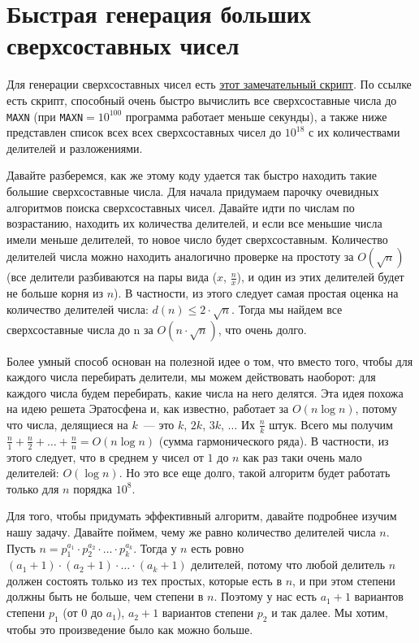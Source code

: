 \section{Быстрая генерация больших сверхсоставных чисел}

Для генерации сверхсоставных чисел есть \href{https://gist.github.com/dario2994/fb4713f252ca86c1254d}{этот замечательный скрипт}. По ссылке есть скрипт, способный очень быстро вычислить все сверхсоставные числа до \verb+MAXN+ (при \verb+MAXN+$=10^{100}$ программа работает меньше секунды), а также ниже представлен список всех всех сверхсоставных чисел до $10^{18}$ с их количествами делителей и разложениями.

Давайте разберемся, как же этому коду удается так быстро находить такие большие сверхсоставные числа. Для начала придумаем парочку очевидных алгоритмов поиска сверхсоставных чисел. Давайте идти по числам по возрастанию, находить их количества делителей, и если все меньшие числа имели меньше делителей, то новое число будет сверхсоставным. Количество делителей числа можно находить аналогично проверке на простоту за $O(\sqrt n)$ (все делители разбиваются на пары вида ($x$, $\frac{n}{x}$), и один из этих делителей будет не больше корня из $n$). В частности, из этого следует самая простая оценка на количество делителей числа: $d(n) \le 2 \cdot \sqrt n$. Тогда мы найдем все сверхсоставные числа до n за $O(n \cdot \sqrt n)$, что очень долго.

Более умный способ основан на полезной идее о том, что вместо того, чтобы для каждого числа перебирать делители, мы можем действовать наоборот: для каждого числа будем перебирать, какие числа на него делятся. Эта идея похожа на идею решета Эратосфена и, как известно, работает за $O(n \log n)$, потому что числа, делящиеся на $k$~--- это $k$,  $2k$, $3k$, $\ldots$ Их $\frac{n}{k}$ штук. Всего мы получим $\frac{n}{1} + \frac{n}{2} + \ldots + \frac{n}{n} = O(n \log n)$ (сумма гармонического ряда). В частности, из этого следует, что в среднем у чисел от $1$ до $n$ как раз таки очень мало делителей: $O(\log n)$. Но это все еще долго, такой алгоритм будет работать только для $n$ порядка $10^8$.

Для того, чтобы придумать эффективный алгоритм, давайте подробнее изучим нашу задачу. Давайте поймем, чему же равно количество делителей числа $n$. Пусть $n = p_1^{a_1} \cdot p_2^{a_2} \cdot \ldots \cdot p_k^{a_k}$. Тогда у $n$ есть ровно $(a_1 + 1) \cdot (a_2 + 1) \cdot \ldots \cdot (a_k + 1)$ делителей, потому что любой делитель $n$ должен состоять только из тех простых, которые есть в $n$, и при этом степени должны быть не больше, чем степени в $n$. Поэтому у нас есть $a_1 + 1$ вариантов степени $p_1$ (от $0$ до $a_1$), $a_2 + 1$ вариантов степени $p_2$ и так далее. Мы хотим, чтобы это произведение было как можно больше.


